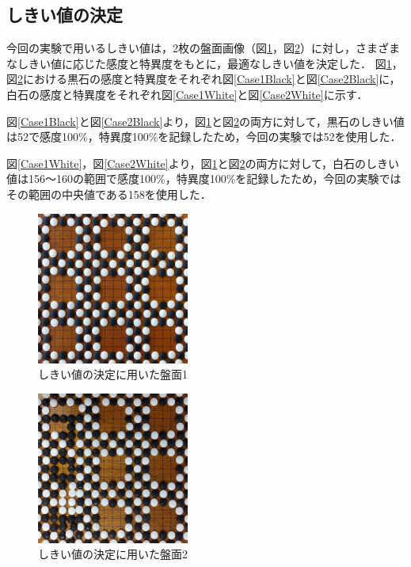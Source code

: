 \documentclass[openright]{nitocs}
\numberwithin{equation}{section}
\begin{document}
        \subsection{しきい値の決定} \label{threshold}
            今回の実験で用いるしきい値は，2枚の盤面画像（図\ref{DSC0087}，図\ref{DSC0100}）に対し，さまざまなしきい値に応じた感度と特異度をもとに，最適なしきい値を決定した．
            図\ref{DSC0087}，図\ref{DSC0100}における黒石の感度と特異度をそれぞれ図\ref{Case1Black}と図\ref{Case2Black}に，
            白石の感度と特異度をそれぞれ図\ref{Case1White}と図\ref{Case2White}に示す．

            図\ref{Case1Black}と図\ref{Case2Black}より，図\ref{DSC0087}と図\ref{DSC0100}の両方に対して，黒石のしきい値は52で感度100\%，特異度100\%を記録したため，今回の実験では52を使用した．

            図\ref{Case1White}，図\ref{Case2White}より，図\ref{DSC0087}と図\ref{DSC0100}の両方に対して，白石のしきい値は156～160の範囲で感度100\%，特異度100\%を記録したため，今回の実験ではその範囲の中央値である158を使用した．
            \begin{figure}[tb] %
                \begin{center}
                \includegraphics[width=50mm,height=50mm]{DSC_0087/boardImg.jpg} 
                \caption{しきい値の決定に用いた盤面1}
                \label{DSC0087}
                \end{center}
            \end{figure}

            \begin{figure}[tb] %
                \begin{center}
                \includegraphics[width=50mm,height=50mm]{DSC_0100/boardImg.jpg} 
                \caption{しきい値の決定に用いた盤面2}
                \label{DSC0100}
                \end{center}
            \end{figure}
\end{document}
